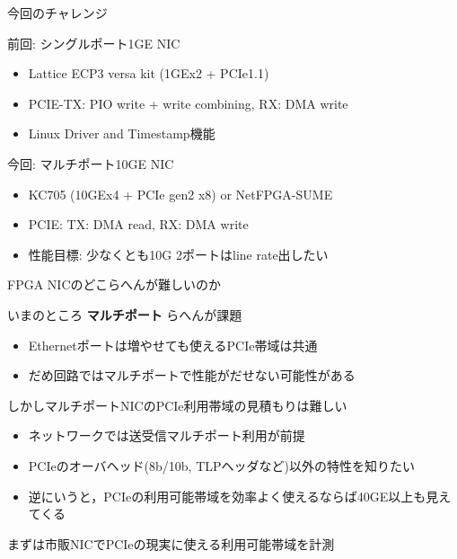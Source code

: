 \documentclass[10pt, compress]{beamer}
\begin{document}

\begin{frame}[fragile,t]{今回のチャレンジ}

前回: シングルポート1GE NIC
\vspace{-.5em}
\begin{itemize}
\item Lattice ECP3 versa kit (1GEx2 + PCIe1.1)
\item PCIE-TX: PIO write + write combining, RX: DMA write
\item Linux Driver and Timestamp機能
\end{itemize}

\vspace{1em}

今回: マルチポート10GE NIC
\vspace{-.5em}
\begin{itemize}
\item KC705 (10GEx4 + PCIe gen2 x8) or NetFPGA-SUME
\item PCIE: TX: DMA read, RX: DMA write
\item 性能目標: 少なくとも10G 2ポートはline rate出したい
\end{itemize}

\end{frame}


\begin{frame}[fragile,t]{FPGA NICのどこらへんが難しいのか}

いまのところ \textbf{マルチポート} らへんが課題
\vspace{-.5em}
\begin{itemize}
\item Ethernetポートは増やせても使えるPCIe帯域は共通
\item だめ回路ではマルチポートで性能がだせない可能性がある
\end{itemize}

\vspace{.5em}

しかしマルチポートNICのPCIe利用帯域の見積もりは難しい
\vspace{-.5em}
\begin{itemize}
\item ネットワークでは送受信マルチポート利用が前提
\item PCIeのオーバヘッド(8b/10b, TLPヘッダなど)以外の特性を知りたい
\item 逆にいうと，PCIeの利用可能帯域を効率よく使えるならば40GE以上も見えてくる
\end{itemize}

まずは市販NICでPCIeの現実に使える利用可能帯域を計測

\end{frame}
\end{document}
